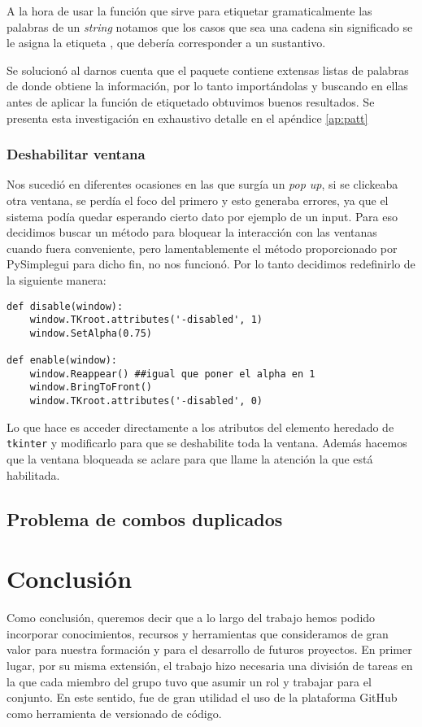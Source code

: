 A la hora de usar la función  que sirve para etiquetar gramaticalmente las palabras de un \emph{string} notamos que los casos que sea una cadena sin significado se le asigna la etiqueta , que debería corresponder a un sustantivo.

Se solucionó al darnos cuenta que el paquete contiene  extensas listas de palabras de donde obtiene la información, por lo tanto importándolas y buscando en ellas antes de aplicar la función de etiquetado obtuvimos buenos resultados. Se presenta esta investigación en exhaustivo detalle en el apéndice \ref{ap:patt}


\subsection{Deshabilitar ventana}
Nos sucedió en diferentes ocasiones en las que surgía un \emph{pop up}, si se clickeaba otra ventana, se perdía el foco del primero y esto generaba errores, ya que el sistema podía quedar esperando cierto dato por ejemplo de un input.
Para eso decidimos buscar un método para bloquear la interacción con las ventanas cuando fuera conveniente, pero lamentablemente el método proporcionado por PySimplegui para dicho fin, no nos funcionó. Por lo tanto decidimos redefinirlo de la siguiente manera:

\begin{verbatim}
def disable(window):
	window.TKroot.attributes('-disabled', 1)
	window.SetAlpha(0.75)

def enable(window):
	window.Reappear() ##igual que poner el alpha en 1
	window.BringToFront()
	window.TKroot.attributes('-disabled', 0)
\end{verbatim}
Lo que hace es acceder directamente a los atributos del elemento heredado de \texttt{tkinter} y modificarlo para que se deshabilite toda la ventana. Además hacemos que la ventana bloqueada se aclare para que llame la atención la que está habilitada.
\section{Problema de combos duplicados}

\chapter{Conclusión}

Como conclusión, queremos decir que a lo largo del trabajo hemos podido incorporar conocimientos, recursos y herramientas que consideramos de gran valor para nuestra formación y para el desarrollo de futuros proyectos. En primer lugar, por su misma extensión, el trabajo hizo necesaria una división de tareas en la que cada miembro del grupo tuvo que asumir un rol y trabajar para el conjunto. En este sentido, fue de gran utilidad el uso de la plataforma GitHub como herramienta de versionado de código.

